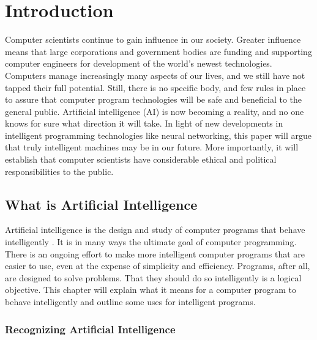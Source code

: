 \chapter{Introduction}
Computer scientists continue to gain influence in our society. Greater influence
means that large corporations and government bodies are funding and supporting
computer engineers for development of the world’s newest technologies. Computers
manage increasingly many aspects of our lives, and we still have not tapped their full
potential. Still, there is no specific body, and few rules in place to assure that computer
program technologies will be safe and beneficial to the general public. Artificial
intelligence (AI) is now becoming a reality, and no one knows for sure what direction it
will take. In light of new developments in intelligent programming technologies like
neural networking, this paper will argue that truly intelligent machines may be in our
future. More importantly, it will establish that computer scientists have considerable
ethical and political responsibilities to the public.


\section{What is Artificial Intelligence}

Artificial intelligence is the design and study of computer programs that behave
intelligently \cite{one}. It is in many ways the ultimate goal of computer programming.
There is an ongoing effort to make more intelligent computer programs that are easier to
use, even at the expense of simplicity and efficiency. Programs, after all, are designed to
solve problems. That they should do so intelligently is a logical objective. This chapter
will explain what it means for a computer program to behave intelligently and outline
some uses for intelligent programs.

    \subsection{Recognizing Artificial Intelligence}
    
